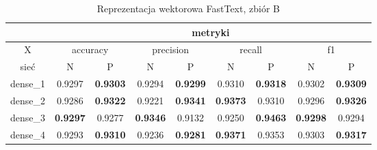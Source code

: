 \begin{table}[p]  \centering
    \caption{Reprezentacja wektorowa FastText, zbiór B}
    \label{tab:wyniki_fasttext_B}
    \begin{tabular} {|c|c|c|c|c|c|c|c|c| }    \hline
                 & \multicolumn{8}{c|}{metryki}                                                                                                                                                                                                                                                \\ \hline
        X        & \multicolumn{2}{c|}{accuracy} & \multicolumn{2}{c|}{precision}      & \multicolumn{2}{c|}{recall}    & \multicolumn{2}{c|}{f1}                                                                                                                                              \\ \hline
        sieć     & N                             & P                                   & N                              & P                              & N                          & P                                   & N                          & P                                   \\ \hline
        dense\_1 & 0.9297                        & \textbf{0.9303}                     & 0.9294                         & \textbf{0.9299}                & 0.9310                     & \textbf{0.9318}                     & 0.9302                     & \textbf{0.9309}                     \\ \hline
        dense\_2 & 0.9286                        & \textbf{0.9322}                     & 0.9221                         & \textbf{0.9341}                & \textbf{0.9373}            & 0.9310                              & 0.9296                     & \textbf{0.9326}                     \\ \hline
        dense\_3 & \textbf{0.9297}               & 0.9277                              & \textbf{0.9346}                & 0.9132                         & 0.9250                     & \textbf{0.9463}                     & \textbf{0.9298}            & 0.9294                              \\ \hline
        dense\_4 & 0.9293                        & \textbf{0.9310}                     & 0.9236                         & \textbf{0.9281}                & \textbf{0.9371}            & 0.9353                              & 0.9303                     & \textbf{0.9317}                     \\ \hline

\end{tabular}
\end{table}
